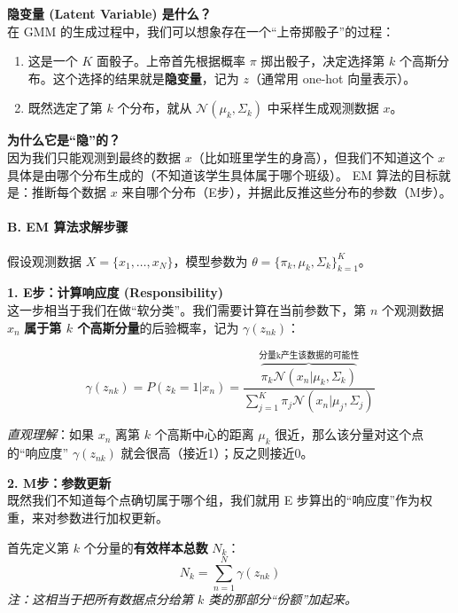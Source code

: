 \documentclass[a4paper, 11pt]{ctexart}
\begin{document}
\textbf{隐变量 (Latent Variable) 是什么？} \\
在 GMM 的生成过程中，我们可以想象存在一个“上帝掷骰子”的过程：
\begin{enumerate}
    \item 这是一个 $K$ 面骰子。上帝首先根据概率 $\pi$ 掷出骰子，决定选择第 $k$ 个高斯分布。这个选择的结果就是\textbf{隐变量}，记为 $z$（通常用 one-hot 向量表示）。
    \item 既然选定了第 $k$ 个分布，就从 $\mathcal{N}(\mu_k, \Sigma_k)$ 中采样生成观测数据 $x$。
\end{enumerate}
\textbf{为什么它是“隐”的？} \\
因为我们只能观测到最终的数据 $x$（比如班里学生的身高），但我们不知道这个 $x$ 具体是由哪个分布生成的（不知道该学生具体属于哪个班级）。
EM 算法的目标就是：推断每个数据 $x$ 来自哪个分布（E步），并据此反推这些分布的参数（M步）。

\paragraph{B. EM 算法求解步骤}

假设观测数据 $X = \{x_1, \dots, x_N\}$，模型参数为 $\theta = \{ \pi_k, \mu_k, \Sigma_k \}_{k=1}^K$。

\textbf{1. E步：计算响应度 (Responsibility)} \\
这一步相当于我们在做“软分类”。我们需要计算在当前参数下，第 $n$ 个观测数据 $x_n$ \textbf{属于第 $k$ 个高斯分量}的后验概率，记为 $\gamma(z_{nk})$：

\begin{equation}
    \gamma(z_{nk}) = P(z_k=1 | x_n) = \frac{\overbrace{\pi_k \mathcal{N}(x_n | \mu_k, \Sigma_k)}^{\text{分量k产生该数据的可能性}}}{\sum_{j=1}^K \pi_j \mathcal{N}(x_n | \mu_j, \Sigma_j)}
\end{equation}

\textit{直观理解}：如果 $x_n$ 离第 $k$ 个高斯中心的距离 $\mu_k$ 很近，那么该分量对这个点的“响应度” $\gamma(z_{nk})$ 就会很高（接近1）；反之则接近0。

\textbf{2. M步：参数更新} \\
既然我们不知道每个点确切属于哪个组，我们就用 E 步算出的“响应度”作为权重，来对参数进行加权更新。

首先定义第 $k$ 个分量的\textbf{有效样本总数} $N_k$：
\begin{equation}
    N_k = \sum_{n=1}^N \gamma(z_{nk})
\end{equation}
\textit{注：这相当于把所有数据点分给第 $k$ 类的那部分“份额”加起来。}
\end{document}
